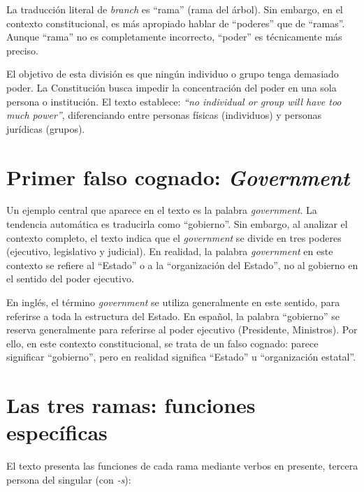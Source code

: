 \documentclass[12pt,oneside]{book}
\begin{document}
\begin{note}
La traducción literal de \textit{branch} es ``rama'' (rama del árbol). Sin embargo, en el contexto constitucional, es más apropiado hablar de ``poderes'' que de ``ramas''. Aunque ``rama'' no es completamente incorrecto, ``poder'' es técnicamente más preciso.
\end{note}

El objetivo de esta división es que ningún individuo o grupo tenga demasiado poder. La Constitución busca impedir la concentración del poder en una sola persona o institución. El texto establece: \textit{``no individual or group will have too much power''}, diferenciando entre personas físicas (individuos) y personas jurídicas (grupos).

\section{Primer falso cognado: \textit{Government}}

Un ejemplo central que aparece en el texto es la palabra \textit{government}. La tendencia automática es traducirla como ``gobierno''. Sin embargo, al analizar el contexto completo, el texto indica que el \textit{government} se divide en tres poderes (ejecutivo, legislativo y judicial). En realidad, la palabra \textit{government} en este contexto se refiere al ``Estado'' o a la ``organización del Estado'', no al gobierno en el sentido del poder ejecutivo.

En inglés, el término \textit{government} se utiliza generalmente en este sentido, para referirse a toda la estructura del Estado. En español, la palabra ``gobierno'' se reserva generalmente para referirse al poder ejecutivo (Presidente, Ministros). Por ello, en este contexto constitucional, se trata de un falso cognado: parece significar ``gobierno'', pero en realidad significa ``Estado'' u ``organización estatal''.

\section{Las tres ramas: funciones específicas}

El texto presenta las funciones de cada rama mediante verbos en presente, tercera persona del singular (con \textit{-s}):
\end{document}
